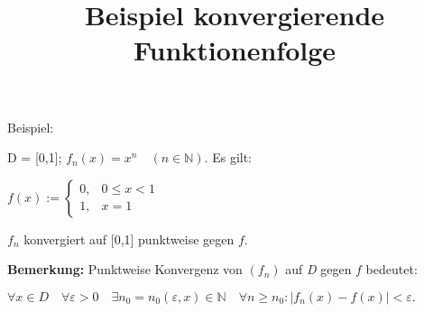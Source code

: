 \documentclass{article}
\title{Beispiel konvergierende Funktionenfolge}
\begin{document}
\maketitle

Beispiel:
\vspace{5mm}

D = [0,1];   \begin{math}
f_n(x) = x^n \quad (n \in \mathbb{N}).\end{math} Es gilt: \vspace{5mm}

\begin{math} f(x) := 
\begin{cases} 
0, & 0 \leq x < 1\\
1, & x = 1
\end{cases} \end{math}
\vspace{5mm}

$f_n$ konvergiert auf [0,1] punktweise gegen $f$.

\vspace{10mm}
\textbf{Bemerkung:} Punktweise Konvergenz von $(f_n)$ auf \textit{D} gegen $f$ bedeutet:

\vspace{5mm}
\begin{math}
\forall x \in D \quad \forall \varepsilon > 0 \quad \exists n_0 = n_0(\varepsilon, x) \in \mathbb{N} \quad \forall n \geq n_0: |f_n(x) - f(x)| < \varepsilon.
\end{math}
\end{document}
